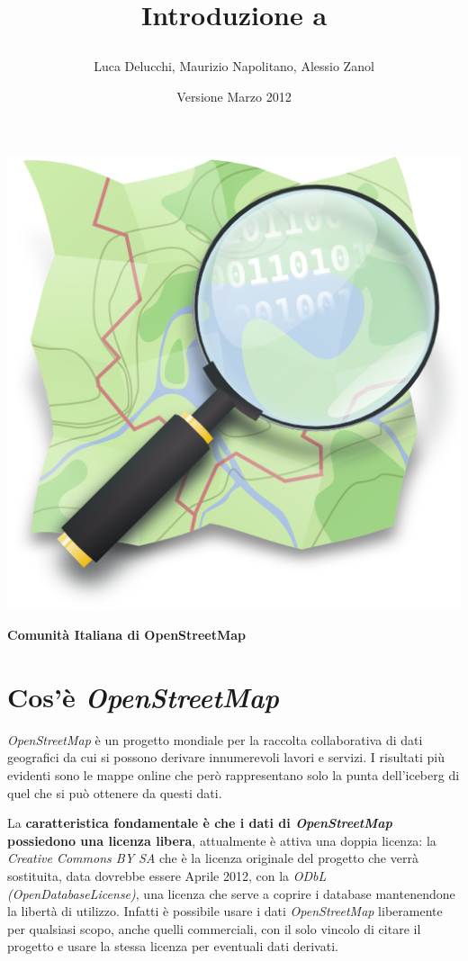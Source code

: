 \documentclass[a4paper,twoside,12pt,]{article}
\title{\begin{Large}Introduzione a \osm\end{Large}}
\date{\small{Versione Marzo 2012}}
\author{Luca Delucchi, Maurizio Napolitano, Alessio Zanol}
\newcommand{\osm}{\emph{OpenStreetMap}\xspace}
\newcommand{\pro}[1]{\emph{#1}}
\begin{document}
\maketitle
\begin{center}
\includegraphics{osm_logo_new.png}
\end{center}
\begin{center}
	\begin{large}
	\textbf{Comunità Italiana di OpenStreetMap}
	\end{large}
\end{center}
\newpage

\section{Cos'è \osm}
\osm è un progetto mondiale per la raccolta collaborativa di dati geografici da cui si possono derivare innumerevoli lavori e servizi. I risultati più evidenti sono le mappe online che però rappresentano solo la punta dell'iceberg di quel che si può ottenere da questi dati.

La \textbf{caratteristica fondamentale è che i dati di \osm possiedono una licenza libera}, attualmente è attiva una doppia licenza: la \pro{Creative Commons BY SA} che è la licenza originale del progetto che verrà sostituita, data dovrebbe essere Aprile 2012, con la \pro{ODbL (OpenDatabaseLicense)}, una licenza che serve a coprire i database mantenendone la libertà di utilizzo. Infatti è possibile usare i dati \osm liberamente per qualsiasi scopo, anche quelli commerciali, con il solo vincolo di citare il progetto e usare la stessa licenza per eventuali dati derivati. 
\end{document}
